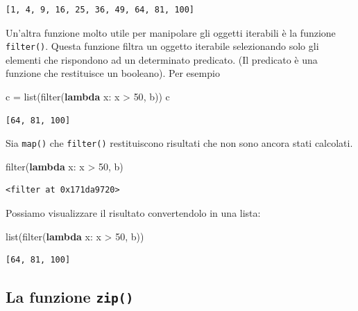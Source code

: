 \documentclass[
  letterpaper,
  krantz2]{{[}./krantz{]}}
\newenvironment{Shaded}{\begin{snugshade}}{\end{snugshade}}
\newcommand{\BuiltInTok}[1]{\textcolor[rgb]{0.00,0.23,0.31}{#1}}
\newcommand{\DecValTok}[1]{\textcolor[rgb]{0.68,0.00,0.00}{#1}}
\newcommand{\KeywordTok}[1]{\textcolor[rgb]{0.00,0.23,0.31}{\textbf{#1}}}
\newcommand{\NormalTok}[1]{\textcolor[rgb]{0.00,0.23,0.31}{#1}}
\newcommand{\OperatorTok}[1]{\textcolor[rgb]{0.37,0.37,0.37}{#1}}
\begin{document}
\begin{verbatim}
[1, 4, 9, 16, 25, 36, 49, 64, 81, 100]
\end{verbatim}

Un'altra funzione molto utile per manipolare gli oggetti iterabili è la
funzione \texttt{filter()}. Questa funzione filtra un oggetto iterabile
selezionando solo gli elementi che rispondono ad un determinato
predicato. (Il predicato è una funzione che restituisce un booleano).
Per esempio

\begin{Shaded}
\begin{Highlighting}[]
\NormalTok{c }\OperatorTok{=} \BuiltInTok{list}\NormalTok{(}\BuiltInTok{filter}\NormalTok{(}\KeywordTok{lambda}\NormalTok{ x: x }\OperatorTok{\textgreater{}} \DecValTok{50}\NormalTok{, b))}
\NormalTok{c}
\end{Highlighting}
\end{Shaded}

\begin{verbatim}
[64, 81, 100]
\end{verbatim}

Sia \texttt{map()} che \texttt{filter()} restituiscono risultati che non
sono ancora stati calcolati.

\begin{Shaded}
\begin{Highlighting}[]
\BuiltInTok{filter}\NormalTok{(}\KeywordTok{lambda}\NormalTok{ x: x }\OperatorTok{\textgreater{}} \DecValTok{50}\NormalTok{, b)}
\end{Highlighting}
\end{Shaded}

\begin{verbatim}
<filter at 0x171da9720>
\end{verbatim}

Possiamo visualizzare il risultato convertendolo in una lista:

\begin{Shaded}
\begin{Highlighting}[]
\BuiltInTok{list}\NormalTok{(}\BuiltInTok{filter}\NormalTok{(}\KeywordTok{lambda}\NormalTok{ x: x }\OperatorTok{\textgreater{}} \DecValTok{50}\NormalTok{, b))}
\end{Highlighting}
\end{Shaded}

\begin{verbatim}
[64, 81, 100]
\end{verbatim}

\subsection{\texorpdfstring{La funzione
\texttt{zip()}}{La funzione zip()}}\label{la-funzione-zip}
\end{document}
